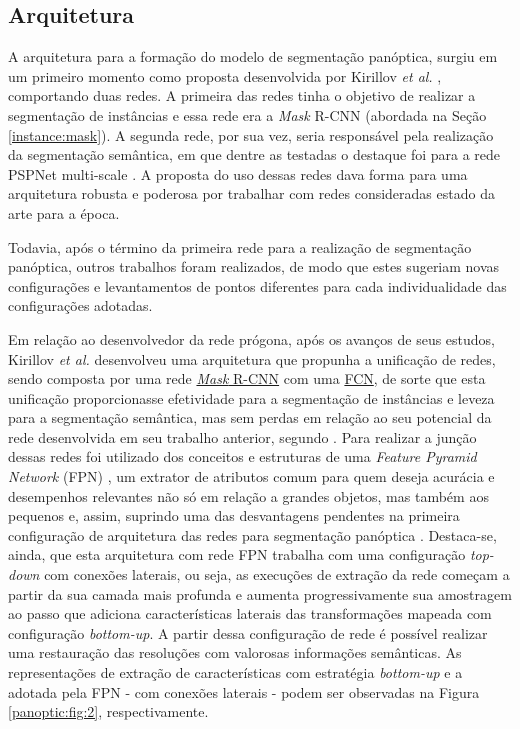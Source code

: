 \subsection{Arquitetura}
\label{panoptic:arch}
A arquitetura para a formação do modelo de segmentação panóptica, surgiu em um primeiro momento como proposta desenvolvida por Kirillov \textit{et al.} \cite{Kirillov2019a}, comportando duas redes. A primeira das redes tinha o objetivo de realizar a segmentação de instâncias e essa rede era a \textit{Mask} R-CNN \cite{He2020} (abordada na Seção \ref{instance:mask}). A segunda rede, por sua vez, seria responsável pela realização da segmentação semântica, em que dentre as testadas o destaque foi para a rede PSPNet multi-scale \cite{Zhao2017}. A proposta do uso dessas redes dava forma para uma arquitetura robusta e poderosa \cite{Kirillov2019a} por trabalhar com redes consideradas estado da arte para a época.

Todavia, após o término da primeira rede para a realização de segmentação panóptica, outros trabalhos foram realizados, de modo que estes sugeriam novas configurações e levantamentos de pontos diferentes para cada individualidade das configurações adotadas.

Em relação ao desenvolvedor da rede prógona, após os avanços de seus estudos, Kirillov \textit{et al.} \cite{Kirillov2019} desenvolveu uma arquitetura que propunha a unificação de redes, sendo composta por uma rede \hyperref[instance:mask]{\textit{Mask} R-CNN} com uma \hyperref[semantic:FCN]{FCN}, de sorte que esta unificação proporcionasse efetividade para a segmentação de instâncias e leveza para a segmentação semântica, mas sem perdas em relação ao seu potencial da rede desenvolvida em seu trabalho anterior, segundo \cite{Kirillov2019}. Para realizar a junção dessas redes foi utilizado dos conceitos e estruturas de uma \textit{Feature Pyramid Network} (FPN) \cite{Lin2016}, um extrator de atributos comum para quem deseja acurácia e desempenhos relevantes não só em relação a grandes objetos, mas também aos pequenos \cite{Lin2016} e, assim, suprindo uma das desvantagens pendentes na primeira configuração de arquitetura das redes para segmentação panóptica \cite{Kirillov2019, Kirillov2019a}. Destaca-se, ainda, que esta arquitetura com rede FPN trabalha com uma configuração \textit{top-down} com conexões laterais, ou seja, as execuções de extração da rede começam a partir da sua camada mais profunda e aumenta progressivamente sua amostragem ao passo que adiciona características laterais das transformações mapeada com configuração \textit{bottom-up}. A partir dessa configuração de rede é possível realizar uma restauração das resoluções com valorosas informações semânticas. As representações de extração de características com estratégia \textit{bottom-up} e a adotada pela FPN - com conexões laterais - podem ser observadas na Figura \ref{panoptic:fig:2}, respectivamente.

